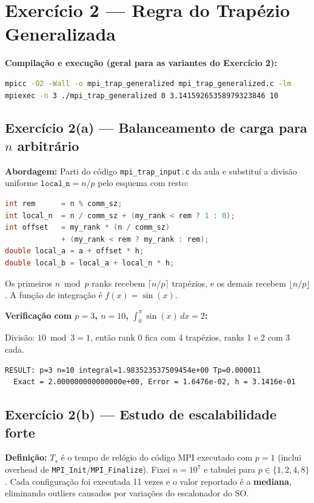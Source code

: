 \documentclass[10pt,small,a4paper]{article}
\begin{document}
\section{Exercício 2 — Regra do Trapézio Generalizada}

\textbf{Compilação e execução (geral para as variantes do Exercício 2):}
\begin{lstlisting}[language=bash,numbers=none]
mpicc -O2 -Wall -o mpi_trap_generalized mpi_trap_generalized.c -lm
mpiexec -n 3 ./mpi_trap_generalized 0 3.14159265358979323846 10
\end{lstlisting}

\subsection{Exercício 2(a) — Balanceamento de carga para $n$ arbitrário}

\textbf{Abordagem:} Parti do código \texttt{mpi\_trap\_input.c} da aula e
substituí a divisão uniforme $\texttt{local\_n} = n / p$ pelo esquema com resto:

\begin{lstlisting}[language=C]
int rem      = n % comm_sz;
int local_n  = n / comm_sz + (my_rank < rem ? 1 : 0);
int offset   = my_rank * (n / comm_sz)
             + (my_rank < rem ? my_rank : rem);
double local_a = a + offset * h;
double local_b = local_a + local_n * h;
\end{lstlisting}

Os primeiros $n \bmod p$ ranks recebem $\lceil n/p \rceil$ trapézios, e os demais
recebem $\lfloor n/p \rfloor$. A função de integração é $f(x) = \sin(x)$.

\textbf{Verificação com $p = 3$, $n = 10$, $\int_0^\pi \sin(x)\,dx = 2$:}

Divisão: $10 \bmod 3 = 1$, então rank 0 fica com 4 trapézios, ranks 1 e 2 com 3 cada.

\begin{lstlisting}[language={},numbers=none]
RESULT: p=3 n=10 integral=1.983523537509454e+00 Tp=0.000011
  Exact = 2.000000000000000e+00, Error = 1.6476e-02, h = 3.1416e-01
\end{lstlisting}

\subsection{Exercício 2(b) — Estudo de escalabilidade forte}

\textbf{Definição:} $T_s$ é o tempo de relógio do código MPI executado com $p = 1$
(inclui overhead de \texttt{MPI\_Init}/\texttt{MPI\_Finalize}).
Fixei $n = 10^7$ e tabulei para $p \in \{1, 2, 4, 8\}$. Cada configuração foi
executada 11 vezes e o valor reportado é a \textbf{mediana}, eliminando outliers
causados por variações do escalonador do SO.
\end{document}
